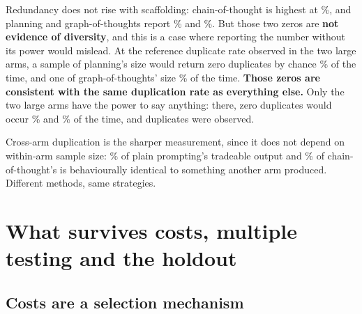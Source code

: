 \documentclass[11pt,a4paper]{article}
\begin{document}
Redundancy does not rise with scaffolding: chain-of-thought is highest at \pgmCotRedund\%,
and planning and graph-of-thoughts report \pgmPlanRedund\% and \pgmGraphRedund\%. But those two
zeros are \textbf{not evidence of diversity}, and this is a case where reporting the number
without its power would mislead. At the reference duplicate rate observed in the two large arms, a
sample of planning's size would return zero duplicates by chance \pgmPlanPZero\% of the time, and
one of graph-of-thoughts' size \pgmGraphPZero\% of the time. \textbf{Those zeros are consistent
with the same duplication rate as everything else.} Only the two large arms have the power to say
anything: there, zero duplicates would occur \pgmPlainPZero\% and \pgmCotPZero\% of the time, and
duplicates were observed.


Cross-arm duplication is the sharper measurement, since it does not depend on within-arm sample
size: \pgmPlainXArm\% of plain prompting's tradeable output and \pgmCotXArm\% of
chain-of-thought's is behaviourally identical to something another arm produced. Different
methods, same strategies.

\section{What survives costs, multiple testing and the holdout}
\label{sec:survives}

\subsection{Costs are a selection mechanism}
\end{document}
